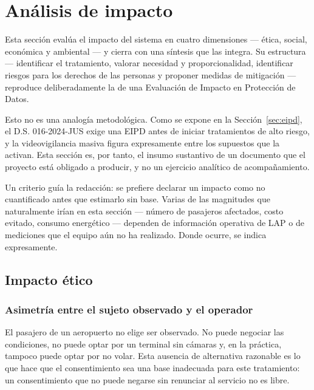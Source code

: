 \section{Análisis de impacto}
\label{sec:analisis}

Esta sección evalúa el impacto del sistema en cuatro dimensiones ---
ética, social, económica y ambiental --- y cierra con una síntesis que
las integra. Su estructura --- identificar el tratamiento, valorar
necesidad y proporcionalidad, identificar riesgos para los derechos de
las personas y proponer medidas de mitigación --- reproduce
deliberadamente la de una Evaluación de Impacto en Protección de Datos.

Esto no es una analogía metodológica. Como se expone en la
Sección~\ref{sec:eipd}, el D.S. 016-2024-JUS exige una EIPD antes de
iniciar tratamientos de alto riesgo, y la videovigilancia masiva figura
expresamente entre los supuestos que la activan. Esta sección es, por
tanto, el insumo sustantivo de un documento que el proyecto está obligado
a producir, y no un ejercicio analítico de acompañamiento.

Un criterio guía la redacción: se prefiere declarar un impacto como no
cuantificado antes que estimarlo sin base. Varias de las magnitudes que
naturalmente irían en esta sección --- número de pasajeros afectados,
costo evitado, consumo energético --- dependen de información operativa
de LAP o de mediciones que el equipo aún no ha realizado. Donde ocurre,
se indica expresamente.

\subsection{Impacto ético}
\label{sec:impacto-etico}

\subsubsection{Asimetría entre el sujeto observado y el operador}

El pasajero de un aeropuerto no elige ser observado. No puede negociar
las condiciones, no puede optar por un terminal sin cámaras y, en la
práctica, tampoco puede optar por no volar. Esta ausencia de alternativa
razonable es lo que hace que el consentimiento sea una base inadecuada
para este tratamiento: un consentimiento que no puede negarse sin
renunciar al servicio no es libre.


